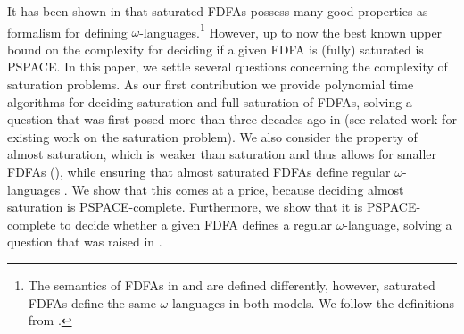 \documentclass[a4paper,USenglish,cleveref,autoref,thm-restate]{lipics-v2021}
\newcommand{\PSPACE}{\textsf{PSPACE}\xspace}
\begin{document}
It has been shown in \cite{AngluinBF18} that saturated FDFAs possess many good properties as formalism for defining $\omega$-languages.\footnote{The semantics of FDFAs in \cite{AngluinBF18} and \cite{Klarlund94} are defined differently, however, saturated FDFAs define the same $\omega$-languages in both models. We follow the definitions from \cite{AngluinBF18}.} However, up to now the best known upper bound on the complexity for deciding if a given FDFA is (fully) saturated is \PSPACE \cite{AngluinBF18}. In this paper, we settle several questions concerning the complexity of saturation problems. 
As our first contribution we provide polynomial time algorithms for deciding saturation and full saturation of FDFAs, solving a question that was first posed more than three decades ago in \cite{CalbrixNP93} (see related work for existing work on the saturation problem). 
We also consider the property of almost saturation, which is weaker than saturation and thus allows for smaller FDFAs (), while ensuring that almost saturated FDFAs define regular $\omega$-languages \cite{LiST23}. We show that this comes at a price, because deciding almost saturation is \PSPACE-complete. Furthermore, we show that it is \PSPACE-complete to decide whether a given FDFA defines a regular $\omega$-language, solving a question that was raised in \cite{CalbrixN95}.
\end{document}
